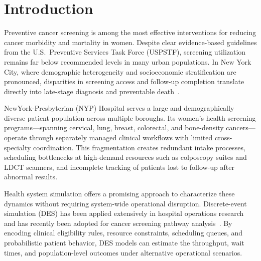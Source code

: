 \documentclass[12pt]{article}
\begin{document}
\begin{abstract}
\vspace{0.5em}
\noindent
\textbf{Conclusion.}
This simulation provides a quantitative foundation for health system planning
at NYP, enabling prospective evaluation of scheduling policies and
coordinated-care interventions before implementation.
Future work will incorporate EHR-calibrated parameters and health equity
stratification by race, ethnicity, and insurance status.

\vspace{0.5em}
\noindent
\textbf{Keywords:} discrete-event simulation, cancer screening, women's
health, health equity, scheduling, loss-to-follow-up, digital twin,
NewYork-Presbyterian
\end{abstract}

\newpage
\setcounter{page}{1}

\section{Introduction}

Preventive cancer screening is among the most effective interventions for
reducing cancer morbidity and mortality in women.
Despite clear evidence-based guidelines from the U.S.\ Preventive Services
Task Force (USPSTF), screening utilization remains far below recommended
levels in many urban populations.
In New York City, where demographic heterogeneity and socioeconomic
stratification are pronounced, disparities in screening access and follow-up
completion translate directly into late-stage diagnosis and preventable
death~\cite{bonafede2019}.

NewYork-Presbyterian (NYP) Hospital serves a large and demographically diverse
patient population across multiple boroughs.
Its women's health screening programs—spanning cervical, lung, breast,
colorectal, and bone-density cancers—operate through separately managed
clinical workflows with limited cross-specialty coordination.
This fragmentation creates redundant intake processes, scheduling bottlenecks
at high-demand resources such as colposcopy suites and LDCT scanners, and
incomplete tracking of patients lost to follow-up after abnormal results.

Health system simulation offers a promising approach to characterize these
dynamics without requiring system-wide operational disruption.
Discrete-event simulation (DES) has been applied extensively in hospital
operations research and has recently been adopted for cancer screening pathway
analysis~\cite{kuruppu2025}.
By encoding clinical eligibility rules, resource constraints, scheduling
queues, and probabilistic patient behavior, DES models can estimate the
throughput, wait times, and population-level outcomes under alternative
operational scenarios.
\end{document}
